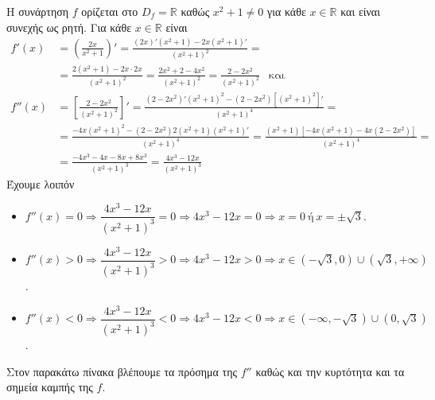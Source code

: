 \lysh
Η συνάρτηση $f$ ορίζεται στο $D_f=\mathbb{R}$ καθώς $x^2+1\neq 0$ για κάθε $x\in\mathbb{R}$ και είναι συνεχής ως ρητή. Για κάθε $x\in\mathbb{R}$ είναι
\begin{align*}
f'(x)&=\left(\frac{2x}{x^2+1}\right)'=\frac{(2x)'\left(x^2+1\right)-2x\left(x^2+1\right)'}{\left(x^2+1\right)^2}=\\
&=\frac{2\left(x^2+1\right)-2x\cdot 2x}{\left(x^2+1\right)^2}=\frac{2x^2+2-4x^2}{\left(x^2+1\right)^2}=\frac{2-2x^2}{\left(x^2+1\right)^2}\ \ \text{ και}\\
f''(x)&=\left[\frac{2-2x^2}{\left(x^2+1\right)^2}\right]'=\frac{\left(2-2x^2\right)'\left(x^2+1\right)^2-\left(2-2x^2\right)\left[\left(x^2+1\right)^2\right]'}{\left(x^2+1\right)^4}=\\&=\frac{-4x\left(x^2+1\right)^2-\left(2-2x^2\right)2\left(x^2+1\right)\left(x^2+1\right)'}{\left(x^2+1\right)^4}=\frac{\left(x^2+1\right)\left[-4x\left(x^2+1\right)-4x\left(2-2x^2\right)\right]}{\left(x^2+1\right)^4}=\\
&=\frac{-4x^3-4x-8x+8x^3}{\left(x^2+1\right)^3}=\frac{4x^3-12x}{\left(x^2+1\right)^3}
\end{align*}
Έχουμε λοιπόν
\begin{itemize}
\item $f''(x)=0\Rightarrow \dfrac{4x^3-12x}{\left(x^2+1\right)^3}=0\Rightarrow 4x^3-12x=0\Rightarrow x=0\ \text{ή}\ x=\pm\sqrt{3}$.
\item $f''(x)>0\Rightarrow \dfrac{4x^3-12x}{\left(x^2+1\right)^3}>0\Rightarrow 4x^3-12x>0\Rightarrow x\in(-\sqrt{3},0)\cup(\sqrt{3},+\infty)$.
\item $f''(x)<0\Rightarrow \dfrac{4x^3-12x}{\left(x^2+1\right)^3}<0\Rightarrow 4x^3-12x<0\Rightarrow x\in(-\infty,-\sqrt{3})\cup(0,\sqrt{3})$.
\end{itemize}
Στον παρακάτω πίνακα βλέπουμε τα πρόσημα της $f''$ καθώς και την κυρτότητα και τα σημεία καμπής της $f$.
\\
